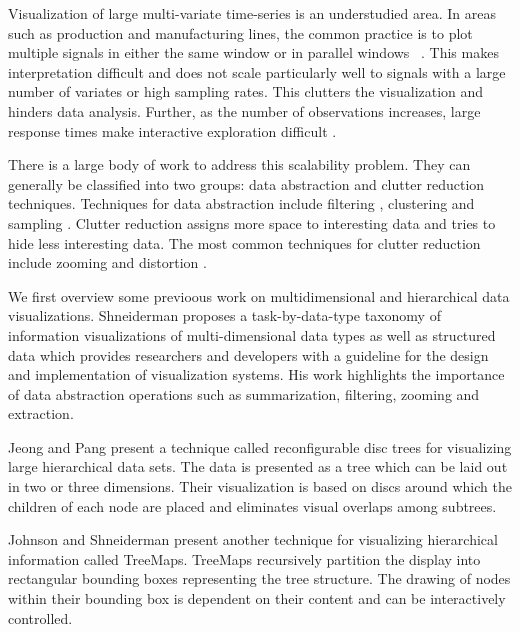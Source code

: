 
Visualization of large multi-variate time-series is an understudied area. In areas such as production and manufacturing lines, the common practice is to plot multiple signals in either the same window or in parallel windows~\cite{} . This makes interpretation difficult and does not scale particularly well to signals with a large number of variates or high sampling rates. %
This clutters the visualization and hinders data analysis. Further, as the number of observations increases,
 large response times make interactive exploration difficult .

There is a large body of work to address this scalability problem.
They can generally be classified into two groups: data abstraction and clutter reduction 
techniques. Techniques for data abstraction include filtering \cite{conf/chi/AhlbergS94b}, clustering
and sampling \cite{553159}. Clutter reduction assigns more space to interesting data and tries to hide less interesting data.
The most common techniques for clutter reduction include zooming and distortion \cite{559215,1382895,1196005}.


We first overview some previoous work on multidimensional and hierarchical data visualizations. 
Shneiderman \cite{545307} proposes a task-by-data-type taxonomy of information visualizations of multi-dimensional
data types as well as structured data which provides researchers and developers with a guideline for
the design and implementation of visualization systems. His work highlights the importance of data
abstraction operations such as summarization, filtering, zooming and extraction.

Jeong and Pang \cite{729555} present a technique called reconfigurable disc trees for visualizing large 
hierarchical data sets. The data is presented as a tree which can be laid out in two or three dimensions.
Their visualization is based on discs around which the children of each node are placed and eliminates
visual overlaps among subtrees.

Johnson and Shneiderman \cite{Johnson:1991:TSA:949607.949654} present another technique for visualizing hierarchical
information called TreeMaps. TreeMaps recursively partition the display into rectangular bounding boxes representing the 
tree structure. The drawing of nodes within their bounding box is dependent on their content and can be interactively
controlled.

